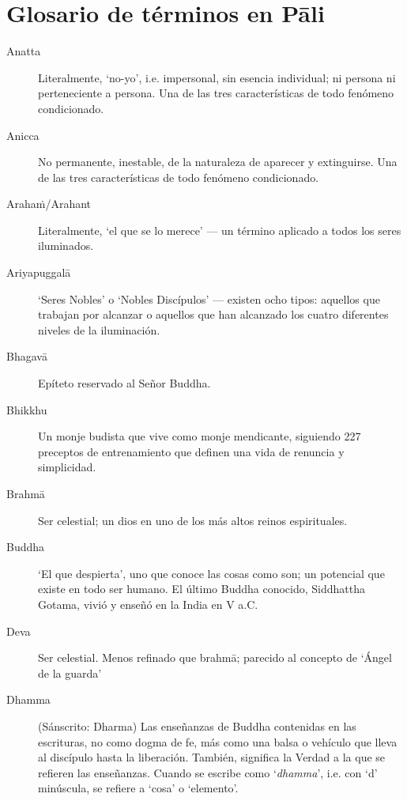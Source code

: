 \chapter{Glosario de términos en Pāli }

\enlargethispage{2\baselineskip}

\begin{description}

\item[Anatta] Literalmente, ‘no-yo’, i.e. impersonal, sin esencia individual;
 ni persona ni perteneciente a persona. Una de las tres características de todo fenómeno condicionado.

\item[Anicca] No permanente, inestable, de la naturaleza de aparecer y extinguirse. Una de las tres características de todo fenómeno condicionado.

\item[Arahaṁ/Arahant] Literalmente, ‘el que se lo merece’ --- un término aplicado a todos los seres iluminados. 

\item[Ariyapuggalā] ‘Seres Nobles’ o ‘Nobles Discípulos’ --- existen ocho tipos: aquellos que trabajan por alcanzar o aquellos que han alcanzado los cuatro diferentes niveles de la iluminación.

\item[Bhagavā] Epíteto reservado al Señor Buddha.

\item[Bhikkhu] Un monje budista que vive como monje mendicante, siguiendo 227 preceptos de entrenamiento que definen una vida de renuncia y simplicidad.

\item[Brahmā] Ser celestial; un dios en uno de los más altos reinos espirituales.

\item[Buddha] ‘El que despierta’, uno que conoce las cosas como son; un potencial que existe en todo ser humano. El último Buddha conocido,
  Siddhattha Gotama, vivió y enseñó en la India en V a.C.

\item[Deva] Ser celestial. Menos refinado que brahmā; parecido al concepto de ‘Ángel de la guarda’

\item[Dhamma] (Sánscrito: Dharma) Las enseñanzas de Buddha contenidas en las escrituras, no como dogma de fe, más como una balsa o vehículo que lleva al discípulo hasta la liberación. También, significa la Verdad a la que se refieren las enseñanzas. Cuando se escribe como ‘\emph{dhamma}’, i.e. con ‘d’ minúscula, se refiere a ‘cosa’ o ‘elemento’.


\end{description}
